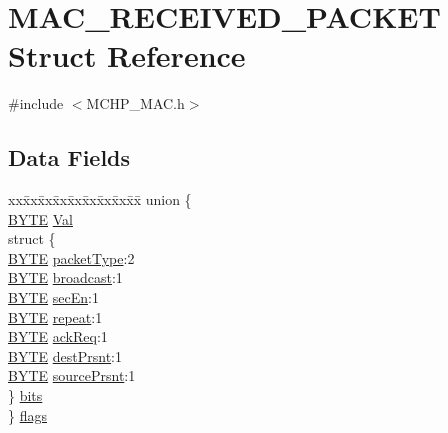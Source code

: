 \hypertarget{struct_m_a_c___r_e_c_e_i_v_e_d___p_a_c_k_e_t}{}\section{M\+A\+C\+\_\+\+R\+E\+C\+E\+I\+V\+E\+D\+\_\+\+P\+A\+C\+K\+E\+T Struct Reference}
\label{struct_m_a_c___r_e_c_e_i_v_e_d___p_a_c_k_e_t}


{\ttfamily \#include $<$M\+C\+H\+P\+\_\+\+M\+A\+C.\+h$>$}

\subsection*{Data Fields}
\begin{DoxyCompactItemize}
\item 
\begin{tabbing}
xx\=xx\=xx\=xx\=xx\=xx\=xx\=xx\=xx\=\kill
union \{\\
\>\hyperlink{_generic_type_defs_8h_a4ae1dab0fb4b072a66584546209e7d58}{BYTE} \hyperlink{struct_m_a_c___r_e_c_e_i_v_e_d___p_a_c_k_e_t_a5ab8c2bf45b20b5f7aa3a4f083896cec}{Val}\\
\>struct \{\\
\>\>\hyperlink{_generic_type_defs_8h_a4ae1dab0fb4b072a66584546209e7d58}{BYTE} \hyperlink{struct_m_a_c___r_e_c_e_i_v_e_d___p_a_c_k_e_t_ae9ba6cc7db0327ea0474edba2cbde11e}{packetType}:2\\
\>\>\hyperlink{_generic_type_defs_8h_a4ae1dab0fb4b072a66584546209e7d58}{BYTE} \hyperlink{struct_m_a_c___r_e_c_e_i_v_e_d___p_a_c_k_e_t_a8b58296433643a710f3f46f836b7254b}{broadcast}:1\\
\>\>\hyperlink{_generic_type_defs_8h_a4ae1dab0fb4b072a66584546209e7d58}{BYTE} \hyperlink{struct_m_a_c___r_e_c_e_i_v_e_d___p_a_c_k_e_t_a85e5fc5440ec2c1e9b7aaa3353b2de88}{secEn}:1\\
\>\>\hyperlink{_generic_type_defs_8h_a4ae1dab0fb4b072a66584546209e7d58}{BYTE} \hyperlink{struct_m_a_c___r_e_c_e_i_v_e_d___p_a_c_k_e_t_ad174427cb4cda416943d7f2887bd8429}{repeat}:1\\
\>\>\hyperlink{_generic_type_defs_8h_a4ae1dab0fb4b072a66584546209e7d58}{BYTE} \hyperlink{struct_m_a_c___r_e_c_e_i_v_e_d___p_a_c_k_e_t_ad6d800fe3f8e6e8dba107e2c4df200c0}{ackReq}:1\\
\>\>\hyperlink{_generic_type_defs_8h_a4ae1dab0fb4b072a66584546209e7d58}{BYTE} \hyperlink{struct_m_a_c___r_e_c_e_i_v_e_d___p_a_c_k_e_t_a95924d7845a6b6b398cc32dd5087c0a7}{destPrsnt}:1\\
\>\>\hyperlink{_generic_type_defs_8h_a4ae1dab0fb4b072a66584546209e7d58}{BYTE} \hyperlink{struct_m_a_c___r_e_c_e_i_v_e_d___p_a_c_k_e_t_a27dd21605fc04451aca0615da8b21582}{sourcePrsnt}:1\\
\>\} \hyperlink{struct_m_a_c___r_e_c_e_i_v_e_d___p_a_c_k_e_t_ad4cab65e01f07763bb9aa65e90102907}{bits}\\
\} \hyperlink{struct_m_a_c___r_e_c_e_i_v_e_d___p_a_c_k_e_t_ab4ef78f33b3b3e9320fc569fa197e9b3}{flags}\\


\end{tabbing}
\end{DoxyCompactItemize}
